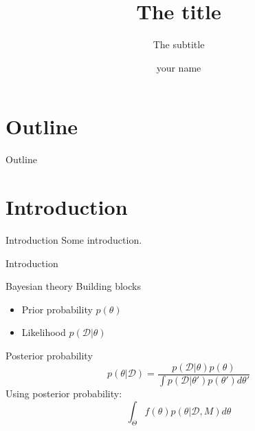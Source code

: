 \documentclass[pdf]{beamer}
\title{The title}
\subtitle{The subtitle}
\author{your name}
\begin{document}

{ 
	\frame{\titlepage}}

\section*{Outline}\begin{frame}{Outline}\tableofcontents
\end{frame}
\begin{frame}
\titlepage
\end{frame}

\section{Introduction}
\begin{frame}{Introduction}
Some introduction.
\end{frame}

\begin{frame}{Introduction}
\begin{block}{Bayesian theory}
Building blocks
\begin{itemize}
	\item Prior probability $p(\theta)$
	\item Likelihood $p(\mathcal{D}|\theta)$
\end{itemize}

Posterior probability
\begin{equation*}
 p(\mathcal{\theta}|\mathcal{D}) = \frac{p(\mathcal{D}|\theta) p(\theta)}{\int p(\mathcal{D}|\theta') p(\theta') d \theta'}
\end{equation*}
\pause
Using posterior probability:
\begin{equation*}
\int_\Theta f(\theta) p(\theta|\mathcal{D},M) d \theta
\end{equation*}
\end{block}
\pause
\begin{block}{}
\end{block}

\end{frame}
\end{document}
